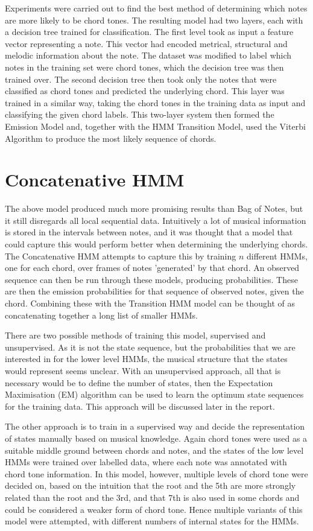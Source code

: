 \documentclass[bsc,singlespacing,logo, parskip, deptreport]{infthesis}
\begin{document}
Experiments were carried out to find the best method of determining which notes are more likely to be chord tones. The resulting model had two layers, each with a decision tree trained for classification. The first level took as input a feature vector representing a note. This vector had encoded metrical, structural and melodic information about the note. The dataset was modified to label which notes in the training set were chord tones, which the decision tree was then trained over. The second decision tree then took only the notes that were classified as chord tones and predicted the underlying chord. This layer was trained in a similar way, taking the chord tones in the training data as input and classifying the given chord labels. This two-layer system then formed the Emission Model and, together with the HMM Transition Model, used the Viterbi Algorithm to produce the most likely sequence of chords.

\section{Concatenative HMM}

The above model produced much more promising results than Bag of Notes, but it still disregards all local sequential data. Intuitively a lot of musical information is stored in the intervals between notes, and it was thought that a model that could capture this would perform better when determining the underlying chords. The Concatenative HMM attempts to capture this by training $n$ different HMMs, one for each chord, over frames of notes 'generated' by that chord. An observed sequence can then be run through these models, producing probabilities. These are then the emission probabilities for that sequence of observed notes, given the chord. Combining these with the Transition HMM model can be thought of as concatenating together a long list of smaller HMMs. 

There are two possible methods of training this model, supervised and unsupervised. As it is not the state sequence, but the probabilities that we are interested in for the lower level HMMs, the musical structure that the states would represent seems unclear. With an unsupervised approach, all that is necessary would be to define the number of states, then the Expectation Maximisation (EM) algorithm can be used to learn the optimum state sequences for the training data. This approach will be discussed later in the report.

The other approach is to train in a supervised way and decide the representation of states manually based on musical knowledge. Again chord tones were used as a suitable middle ground between chords and notes, and the states of the low level HMMs were trained over labelled data, where each  note was annotated with chord tone information. In this model, however, multiple levels of chord tone were decided on, based on the intuition that the root and the 5th are more strongly related than the root and the 3rd, and that 7th is also used in some chords and could be considered a weaker form of chord tone. Hence multiple variants of this model were attempted, with different numbers of internal states for the HMMs.
\end{document}
